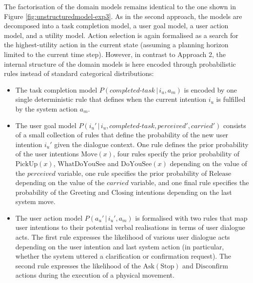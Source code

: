 The factorisation of the domain models remains identical to the one shown in Figure \ref{fig:unstructuredmodel-exp3}.  As in the second approach, the models are decomposed into a task completion model, a user goal model, a user action model, and a utility model.  Action selection is again formalised as a search for the highest-utility action in the current state (assuming a planning horizon limited to the current time step).  However, in contrast to Approach 2, the internal structure of the domain models is here encoded through probabilistic rules instead of standard categorical distributions:
\begin{itemize}
\item The task completion model $P(\mathit{completed\mbox{-}task}\, | \, i_u, a_m)$ is encoded by one single deterministic rule that defines when the current intention $i_u$ is fulfilled by the system action $a_m$. 
\item The user goal model $P(i_u' \, | \, i_u, \mathit{completed\mbox{-}task}, \mathit{perceived'}, \mathit{carried'})$ consists of a small collection of rules that define the probability of the new user intention $i_u'$ given the dialogue context. One rule defines the prior probability of the user intentions $\mathrm{Move(\mathit{x})}$, four rules specify the prior probability of $\mathrm{PickUp(\mathit{x})}$, $\mathrm{WhatDoYouSee}$ and $\mathrm{DoYouSee(\mathit{x})}$ depending on the value of the $\mathit{perceived}$ variable, one rule specifies the prior probability of $\mathrm{Release}$ depending on the value of the $\mathit{carried}$ variable, and one final rule specifies the probability of the $\mathrm{Greeting}$ and $\mathrm{Closing}$ intentions depending on the last system move. 

\item The user action model $P(a_u'\, | \, i_u', a_m)$ is formalised with two rules that map user intentions to their potential verbal realisations in terms of user dialogue acts. The first rule expresses the likelihood of various user dialogue acts depending on the user intention and last system action (in particular, whether the system uttered a clarification or confirmation request).  The second rule expresses the likelihood of the $\mathrm{Ask(Stop)}$ and $\mathrm{Disconfirm}$ actions during the execution of a physical movement.


\end{itemize}
